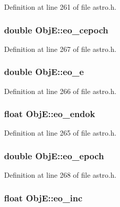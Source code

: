 Definition at line 261 of file astro.\-h.

\hypertarget{struct_obj_e_a2b47b1a9a359291e845e24d6fdd0b389}{
\subsubsection[{eo\-\_\-cepoch}]{\setlength{\rightskip}{0pt plus 5cm}double Obj\-E\-::eo\-\_\-cepoch}}\label{struct_obj_e_a2b47b1a9a359291e845e24d6fdd0b389}


Definition at line 267 of file astro.\-h.

\hypertarget{struct_obj_e_a0405fd0f0db7d32fa17673b2e7310739}{
\subsubsection[{eo\-\_\-e}]{\setlength{\rightskip}{0pt plus 5cm}double Obj\-E\-::eo\-\_\-e}}\label{struct_obj_e_a0405fd0f0db7d32fa17673b2e7310739}


Definition at line 266 of file astro.\-h.

\hypertarget{struct_obj_e_a32f5f29577591f4c0565f678e2564062}{
\subsubsection[{eo\-\_\-endok}]{\setlength{\rightskip}{0pt plus 5cm}float Obj\-E\-::eo\-\_\-endok}}\label{struct_obj_e_a32f5f29577591f4c0565f678e2564062}


Definition at line 265 of file astro.\-h.

\hypertarget{struct_obj_e_a616f7a6b3e8f5be54b889ed4127f51e4}{
\subsubsection[{eo\-\_\-epoch}]{\setlength{\rightskip}{0pt plus 5cm}double Obj\-E\-::eo\-\_\-epoch}}\label{struct_obj_e_a616f7a6b3e8f5be54b889ed4127f51e4}


Definition at line 268 of file astro.\-h.

\hypertarget{struct_obj_e_ae56287dddc0ff0cee17a0c320cb231c4}{
\subsubsection[{eo\-\_\-inc}]{\setlength{\rightskip}{0pt plus 5cm}float Obj\-E\-::eo\-\_\-inc}}\label{struct_obj_e_ae56287dddc0ff0cee17a0c320cb231c4}


